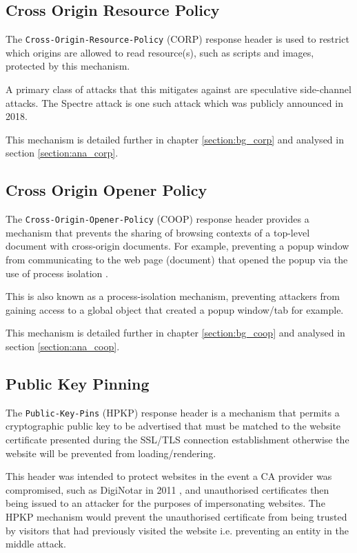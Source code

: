 \documentclass{mscreport}
\begin{document}
\subsection{Cross Origin Resource Policy}
The \texttt{Cross-Origin-Resource-Policy} (CORP) response header is used to restrict which origins are allowed to read resource(s), such as scripts and images, protected by this mechanism.

\vspace{0.3cm} \noindent
A primary class of attacks that this mitigates against are speculative side-channel attacks. The Spectre attack \cite{Kocher2019-gv} is one such attack which was publicly announced in 2018.

\vspace{0.3cm} \noindent
This mechanism is detailed further in chapter \ref{section:bg_corp} and analysed in section \ref{section:ana_corp}.


\subsection{Cross Origin Opener Policy}
The \texttt{Cross-Origin-Opener-Policy} (COOP) response header provides a mechanism that prevents the sharing of browsing contexts of a top-level document with cross-origin documents. For example, preventing a popup window from communicating to the web page (document) that opened the popup via the use of process isolation \cite{Apple_undated-gj}.

\vspace{0.3cm} \noindent
This is also known as a process-isolation mechanism, preventing attackers from gaining access to a global object that created a popup window/tab for example.

\vspace{0.3cm} \noindent
This mechanism is detailed further in chapter \ref{section:bg_coop} and analysed in section \ref{section:ana_coop}.


\subsection{Public Key Pinning}
The \texttt{Public-Key-Pins} (HPKP) response header is a mechanism that permits a cryptographic public key to be advertised that must be matched to the website certificate presented during the SSL/TLS connection establishment otherwise the website will be prevented from loading/rendering.

\vspace{0.3cm} \noindent
This header was intended to protect websites in the event a CA provider was compromised, such as DigiNotar in 2011 \cite{Amann2017-co}, and unauthorised certificates then being issued to an attacker for the purposes of impersonating websites. The HPKP mechanism would prevent the unauthorised certificate from being trusted by visitors that had previously visited the website i.e. preventing an entity in the middle attack.
\end{document}
